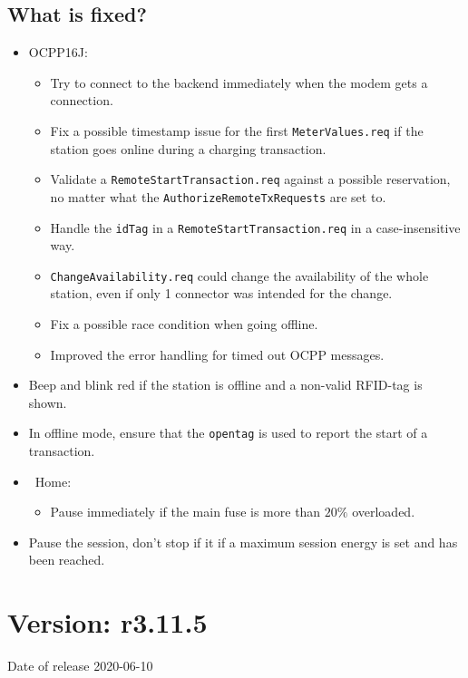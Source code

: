 \documentclass{scrartcl}
\begin{document}
\subsection*{What is fixed?}
\begin{itemize}
\item OCPP16J:
  \begin{itemize}
  \item Try to connect to the backend immediately when the modem gets a
    connection.
  \item Fix a possible timestamp issue for the first \verb|MeterValues.req| if
    the station goes online during a charging transaction.
  \item Validate a \verb|RemoteStartTransaction.req| against a possible
    reservation, no matter what the \verb|AuthorizeRemoteTxRequests| are set
    to.
  \item Handle the \verb|idTag| in a \verb|RemoteStartTransaction.req| in a
    case-insensitive way.
  \item \verb|ChangeAvailability.req| could change the availability of the
    whole station, even if only 1 connector was intended for the change.
  \item Fix a possible race condition when going offline.
  \item Improved the error handling for timed out OCPP messages.
  \end{itemize}
\item Beep and blink red if the station is offline and a non-valid RFID-tag is
  shown.
\item In offline mode, ensure that the \verb|opentag| is used to report the
  start of a transaction.
\item \nanogrid\ Home:
  \begin{itemize}
  \item Pause immediately if the main fuse is more than $20\%$ overloaded.
  \end{itemize}
\item Pause the session, don't stop if it if a maximum session energy is set
  and has been reached.
\end{itemize}

\section{Version: r3.11.5}
Date of release 2020-06-10
\end{document}

